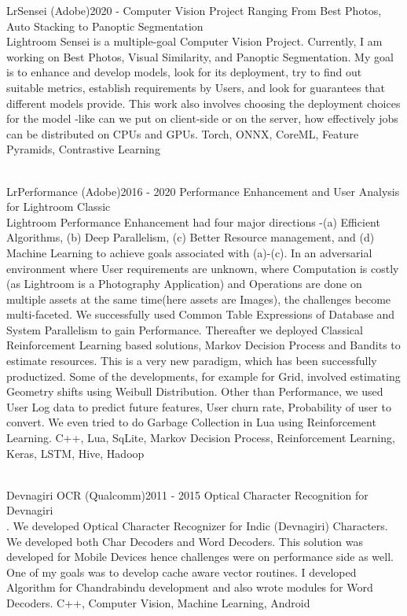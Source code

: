 %
%
%


\begin{projects}
	\project
	{LrSensei (Adobe)}{2020 - }
	{Computer Vision Project Ranging From Best Photos, Auto Stacking to Panoptic Segmentation}
	{\\Lightroom Sensei is a multiple-goal Computer Vision Project. Currently, I am working on Best Photos, Visual Similarity, and Panoptic Segmentation. My goal is to enhance and develop models, look for its deployment, try to find out suitable metrics, establish requirements by Users, and look for guarantees that different models provide. This work also involves choosing the deployment choices for the model -like can we put on client-side or on the server, how effectively jobs can be distributed on CPUs and GPUs. }
	{Torch, ONNX, CoreML, Feature Pyramids, Contrastive Learning}
				
	\project
	{\\LrPerformance (Adobe)}{2016 - 2020}
	{Performance Enhancement and User Analysis for Lightroom Classic}
	{\\Lightroom Performance Enhancement had four major directions -(a) Efficient Algorithms, (b) Deep Parallelism, (c) Better Resource management, and (d) Machine Learning to achieve goals associated with (a)-(c). In an adversarial environment where User requirements are unknown, where Computation is costly (as Lightroom is a Photography Application) and Operations are done on multiple assets at the same time(here assets are Images), the challenges become multi-faceted. We successfully used Common Table Expressions of Database and System Parallelism to gain Performance. Thereafter we deployed Classical Reinforcement Learning based solutions, Markov Decision Process and Bandits to estimate resources. This is a very new paradigm, which has been successfully productized. Some of the developments, for example for Grid, involved estimating Geometry shifts using Weibull Distribution. Other than Performance, we used User Log data to predict future features, User churn rate, Probability of user to convert. We even tried to do Garbage Collection in Lua using Reinforcement Learning.}
	{C++, Lua, SqLite, Markov Decision Process, Reinforcement Learning, Keras, LSTM, Hive, Hadoop}
	
	\project
	{\\Devnagiri OCR (Qualcomm)}{2011 - 2015}
	{Optical Character Recognition for Devnagiri}
	{\\. We developed Optical Character Recognizer for Indic (Devnagiri) Characters. We developed both Char Decoders and Word Decoders. This solution was developed for Mobile Devices hence challenges were on performance side as well. One of my goals was to develop cache aware vector routines. I developed Algorithm for Chandrabindu development and also wrote modules for Word Decoders.}
	{C++, Computer Vision, Machine Learning, Android}	

\end{projects}